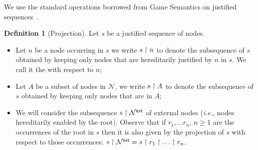 \documentclass{article}
\makeatletter
\theoremstyle{definition}
\newtheorem{definition}{Definition}[section]
\newcommand\Nodes{\mathcal{N}}%
\newcommand{\ExtNodes}{\Nodes^{\sf ext}}
\renewcommand\ie{{\it i.e.\@\xspace}}
\makeatother
\begin{document}
We use the standard operations borrowed from Game Semantics on justified sequences~\cite{Abr02}.

\begin{definition}[Projection]
Let $s$ be a justified sequence of nodes.

\begin{itemize}
\item Let $n$ be a node occurring in $s$ we write $s\upharpoonright n$ to denote the subsequence of $s$ obtained by keeping only nodes that are hereditarily justified by $n$ in $s$. We call it the  with respect to $n$;

 \item Let $A$ be a subset of nodes in $\Nodes$, we write $s \upharpoonright A$ to denote the subsequence of $s$ obtained by keeping only nodes that are in $A$;

 \item We will consider the subsequence $s\filter\ExtNodes$ of external nodes (\ie, nodes hereditarily enabled by the root). Observe that if $r_1, \ldots r_n$, $n\geq 1$ are the occurrences of the root in $s$ then it is also given by the projection of $s$ with respect to those occurrences: $s\filter\ExtNodes = s\filter r_1 \filter \ldots \filter r_n$.
\end{itemize}
\end{definition}
\end{document}
